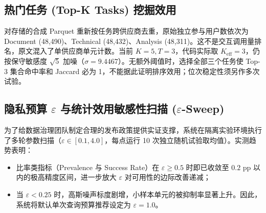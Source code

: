\subsection{热门任务 (Top-K Tasks) 挖掘效用}
对存储的合成 Parquet 重新按任务跨供应商去重，原始独立参与用户数依次为 Document (48,490)、Technical (48,432)、Analysis (48,311)。这不是交互调用量排名，原文混入了单供应商单元计数。当前 $K=5,T=3$，代码实际取 $K_{\text{eff}}=3$，仍按保守敏感度 $\sqrt{5}$ 加噪（$\sigma=9.4467$）。无额外阈值时，选择全部三个任务使 Top-3 集合命中率和 Jaccard 必为 1，不能据此证明排序效用；位次稳定性须另作多次试验。

\subsection{隐私预算 \texorpdfstring{$\varepsilon$}{Epsilon} 与统计效用敏感性扫描 (\texorpdfstring{$\varepsilon$}{Epsilon}-Sweep)}
为了给数据治理团队制定合理的发布政策提供实证支撑，系统在隔离实验环境执行了多轮参数扫描（$\varepsilon \in [0.1, 4.0]$，每点运行 10 次独立随机试验取均值）。实测趋势表明：
\begin{itemize}[leftmargin=2em]
  \item 比率类指标（Prevalence 与 Success Rate）在 $\varepsilon \ge 0.5$ 时即已收敛至 $0.2\text{ pp}$ 以内的极高精度区间，进一步放大 $\varepsilon$ 对可用性的边际改善递减；
  \item 当 $\varepsilon < 0.25$ 时，高斯噪声标度剧增，小样本单元的被抑制率显著上升。因此，系统将默认单次查询预算推荐设定为 $\varepsilon = 1.0$。
\end{itemize}
